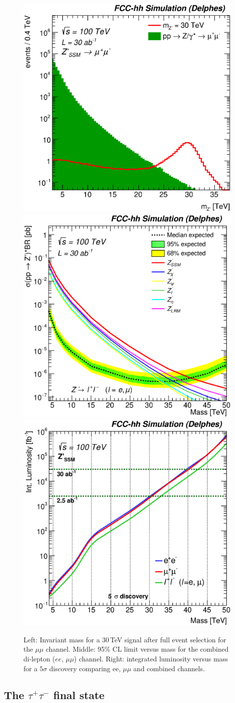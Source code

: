 \documentclass[a4paper,11pt]{article}
\newcommand*{\tautau}{\ensuremath{\tau^{+}\tau^{-}}}
\begin{document}
\begin{figure}[!htb]
  \centering
  \includegraphics[width=0.32\columnwidth]{Fig/mzp_sel0_nostack_log_mm.eps}
  \includegraphics[width=0.32\columnwidth]{Fig/lim_Zprime_ll_fcc_v02_allxs.eps}
  \includegraphics[width=0.32\columnwidth]{Fig/DiscoveryPotential_ll_comb_rootStyle.eps}
  \caption{Left: Invariant mass for a 30\,TeV signal after full event selection for the $\mu\mu$ channel. Middle: 95\% CL limit versus mass for the combined di-lepton ($ee$, $\mu\mu$) channel. Right: integrated luminosity versus mass for a $5\sigma$ discovery comparing ee, $\mu\mu$ and combined channels.}
  \label{figure:leptonicresonances:ll}
\end{figure}



\subsection{The \texorpdfstring{\tautau}{tautau} final state}
\label{sec:leptautau}
\end{document}
